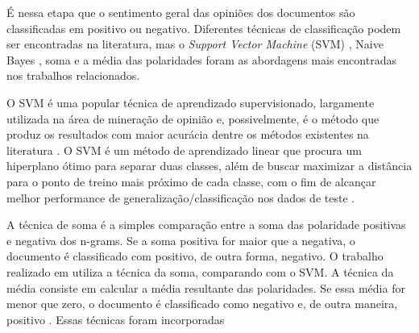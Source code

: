 \documentclass[template.tex]{subfiles}
\begin{document}
É nessa etapa que o sentimento geral das opiniões dos documentos são classificadas em positivo ou negativo. Diferentes técnicas de classificação podem ser encontradas na literatura, mas o \textit{Support Vector Machine} (SVM) \cite{pang2002thumbs, pang2004sentimental, tsutsumi2007movie, prabowo2009sentiment}, Naive Bayes \cite{pang2002thumbs, pang2004sentimental}, soma \cite{ohana2011domain, avancco2014lexicon} e a média \cite{turney2002thumbs, voll2007not, taboada2008extracting, taboada2011lexicon} das polaridades foram as abordagens mais encontradas nos trabalhos relacionados.

O SVM é uma popular técnica de aprendizado supervisionado, largamente utilizada na área de mineração de opinião e, possivelmente, é o método que produz os resultados com maior acurácia dentre os métodos existentes na literatura \cite{moraes2012document}. O SVM é um método de aprendizado linear que procura um hiperplano ótimo para separar duas classes, além de buscar maximizar a distância para o ponto de treino mais próximo de cada classe, com o fim de alcançar melhor performance de generalização/classificação nos dados de teste \cite{friedman2001elements}.


A técnica de soma é a simples comparação entre a soma das polaridade positivas e negativa dos n-grams. Se a soma positiva for maior que a negativa, o documento é classificado com positivo, de outra forma, negativo. O trabalho realizado em  utiliza a técnica da soma, comparando com o SVM. A técnica da média consiste em calcular a média resultante das polaridades. Se essa média for menor que zero, o documento é classificado como negativo e, de outra maneira, positivo . Essas técnicas foram incorporadas 
\end{document}
